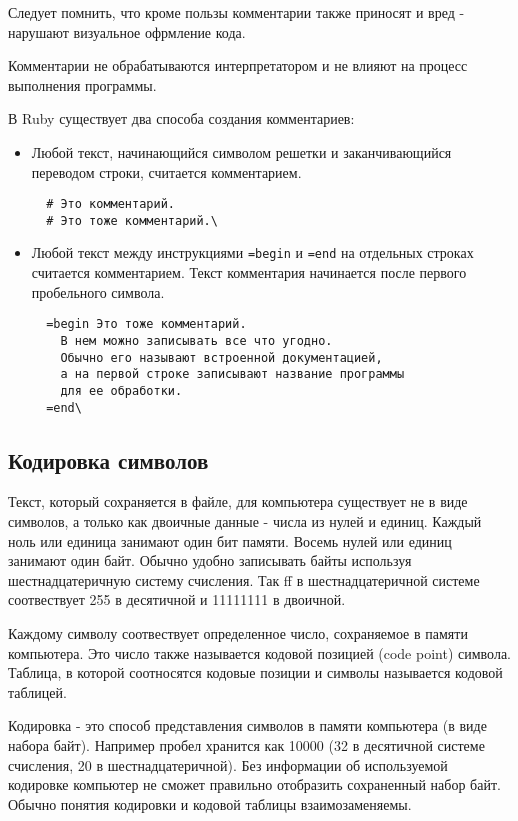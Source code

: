 Следует помнить, что кроме пользы комментарии также приносят и вред - нарушают визуальное офрмление кода.

Комментарии не обрабатываются интерпретатором и не влияют на процесс выполнения программы.

В Ruby существует два способа создания комментариев:
\begin{itemize}
  \item Любой текст, начинающийся символом решетки и заканчивающийся переводом строки, считается комментарием.
  \begin{verbatim}
  # Это комментарий.
  # Это тоже комментарий.\
  \end{verbatim}

  \item Любой текст между инструкциями \verb!=begin! и \verb!=end! на отдельных строках считается комментарием. Текст комментария начинается после первого пробельного символа.
  \begin{verbatim}
  =begin Это тоже комментарий.
    В нем можно записывать все что угодно.
    Обычно его называют встроенной документацией,
    а на первой строке записывают название программы
    для ее обработки.
  =end\
  \end{verbatim}
\end{itemize}

\subsection{Кодировка символов}

Текст, который сохраняется в файле, для компьютера существует не в виде символов, а только как двоичные данные - числа из нулей и единиц. Каждый ноль или единица занимают один бит памяти. Восемь нулей или единиц занимают один байт. Обычно удобно записывать байты используя шестнадцатеричную систему счисления. Так ff в шестнадцатеричной системе соотвествует 255 в десятичной и 11111111 в двоичной.

Каждому символу соотвествует определенное число, сохраняемое в памяти компьютера. Это число также называется кодовой позицией (code point) символа. Таблица, в которой соотносятся кодовые позиции и символы называется кодовой таблицей.

Кодировка - это способ представления символов в памяти компьютера (в виде набора байт). Например пробел хранится как 10000 (32 в десятичной системе счисления, 20 в шестнадцатеричной). Без информации об используемой кодировке компьютер не сможет правильно отобразить сохраненный набор байт. Обычно понятия кодировки и кодовой таблицы взаимозаменяемы.

